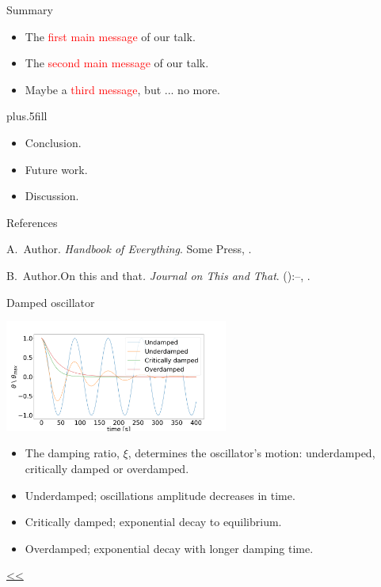 \documentclass{beamer}
\begin{document}
\begin{frame}{Summary}
	\begin{itemize}
		\item The \textcolor{red}{first main message} of our talk.
		\item The \textcolor{red}{second main message} of our talk.
		\item Maybe a \textcolor{red}{third message}, but ... no more.
	\end{itemize}
	\vskip0pt plus.5fill
	\begin{itemize}
		\item Conclusion.
	\end{itemize}
	\begin{itemize}
		\item Future work.
		\item Discussion.
	\end{itemize}
\end{frame}

\begin{frame}{References}
	\begin{thebibliography}{2}
		\beamertemplatebookbibitems
		A.\ Author. \newblock\emph{Handbook of Everything}.\newblock
\textlatin{Some Press, }.

		\beamertemplatearticlebibitems
		B.\ Author.\newblock On this and that\emph{.}
\newblock\emph{Journal on This and That}. 
():--, 
.
	\end{thebibliography}
\end{frame}
\fi






\begin{frame}{\hypertarget{frame:Damped oscillator}{Damped oscillator}}

	\begin{center}		
		\includegraphics[width=0.55\textwidth,keepaspectratio]{damp.png}
    \end{center}
	\begin{itemize}	
		\item The damping ratio, $\xi$, determines the oscillator's motion: underdamped, critically damped or overdamped.
		\item Underdamped; oscillations amplitude decreases in time.
		\item Critically damped; exponential decay to equilibrium.
		\item Overdamped; exponential decay with longer damping time. 		
	\end{itemize}
	\hyperlink{frame:Harmonic oscillator}{<<} 
\end{frame}
\end{document}
